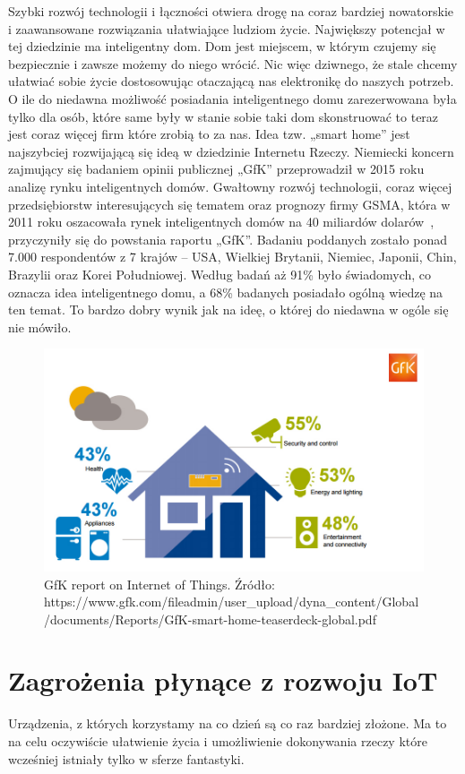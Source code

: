 \documentclass[brudnopis]{xmgr}
\begin{document}
Szybki rozwój technologii i łączności otwiera drogę na coraz bardziej nowatorskie i zaawansowane rozwiązania ułatwiające ludziom życie. Największy potencjał w tej dziedzinie ma inteligentny dom. Dom jest miejscem, w którym czujemy się bezpiecznie i zawsze możemy do niego wrócić. Nic więc dziwnego, że stale chcemy ułatwiać sobie życie dostosowując otaczającą nas elektronikę do naszych potrzeb.
O ile do niedawna możliwość posiadania inteligentnego domu zarezerwowana była tylko dla osób, które same były w stanie sobie taki dom skonstruować to teraz jest coraz więcej firm które zrobią to za nas. Idea tzw. „smart home” jest najszybciej rozwijającą się ideą w dziedzinie Internetu Rzeczy. Niemiecki koncern zajmujący się badaniem opinii publicznej „GfK” przeprowadził w 2015 roku analizę rynku inteligentnych domów. Gwałtowny rozwój technologii, coraz więcej przedsiębiorstw interesujących się tematem oraz prognozy firmy GSMA, która w 2011 roku oszacowała rynek inteligentnych domów na 40 miliardów dolarów~\cite{Gsma:2011:CMC}, przyczyniły się do powstania raportu „GfK”. Badaniu poddanych zostało ponad 7.000 respondentów z 7 krajów – USA, Wielkiej Brytanii, Niemiec, Japonii, Chin, Brazylii oraz Korei Południowej. Według badań aż 91\% było świadomych, co oznacza idea inteligentnego domu, a 68\% badanych posiadało ogólną wiedzę na ten temat. To bardzo dobry wynik jak na ideę, o której do niedawna w ogóle się nie mówiło.
\begin{figure}[h]
\centering
\includegraphics[width=12cm]{m_percent}
\caption{GfK report on Internet of Things. Źródło: https://www.gfk.com/fileadmin/user_upload/dyna_content/Global/documents/Reports/GfK-smart-home-teaserdeck-global.pdf}
\label{fig:exp}
\end{figure} 

\section{Zagrożenia płynące z rozwoju IoT}
Urządzenia, z których korzystamy na co dzień są co raz bardziej złożone. Ma to na celu oczywiście ułatwienie życia i umożliwienie dokonywania rzeczy które wcześniej istniały tylko w sferze fantastyki. 
\end{document}
